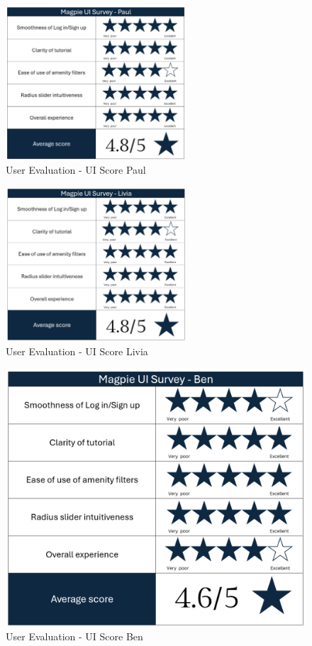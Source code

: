 \begin{figure}[h!]
    \centering
    \includegraphics[width=0.6\textwidth]{images/survey-paul.png}
    \caption{User Evaluation - UI Score Paul}
    \label{fig:paulscore}
\end{figure}
\begin{figure}[h!]
    \centering
    \includegraphics[width=0.6\textwidth]{images/survey-livia.png}
    \caption{User Evaluation - UI Score Livia}
    \label{fig:liviascore}
\end{figure}
\begin{figure}[h!]
    \centering
    \includegraphics[width=\textwidth]{images/survey-ben.png}
    \caption{User Evaluation - UI Score Ben}
    \label{fig:benscore}
\end{figure}
